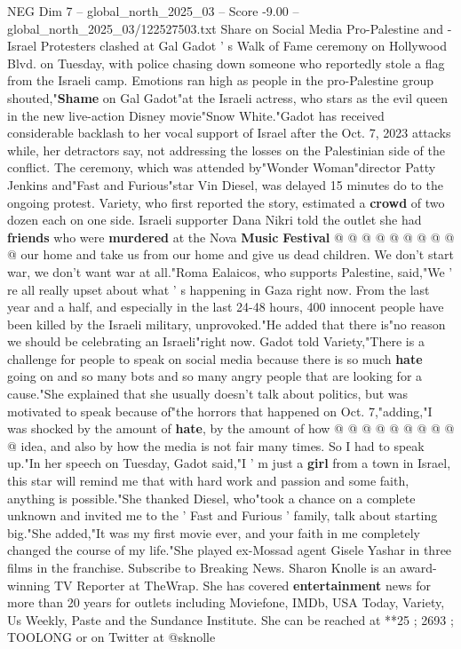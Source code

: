 \begin{textsample}{NEG Dim 7 – global\_north\_2025\_03 – Score -9.00 – global\_north\_2025\_03/122527503.txt}  \label{ex:f7_neg_124}
Share on Social Media Pro-Palestine and -Israel Protesters clashed at Gal Gadot ' s Walk of Fame ceremony on Hollywood Blvd. on Tuesday, with police chasing down someone who reportedly stole a flag from the Israeli camp.
Emotions ran high as people in the pro-Palestine group shouted,"\textbf{Shame} on Gal Gadot"at the Israeli actress, who stars as the evil queen in the new live-action Disney movie"Snow White."Gadot has received considerable backlash to her vocal support of Israel after the Oct. 7, 2023 attacks while, her detractors say, not addressing the losses on the Palestinian side of the conflict.
The ceremony, which was attended by"Wonder Woman"director Patty Jenkins and"Fast and Furious"star Vin Diesel, was delayed 15 minutes do to the ongoing protest.
Variety, who first reported the story, estimated a \textbf{crowd} of two dozen each on one side.
Israeli supporter Dana Nikri told the outlet she had \textbf{friends} who were \textbf{murdered} at the Nova \textbf{Music} \textbf{Festival} @ @ @ @ @ @ @ @ @ @ our home and take us from our home and give us dead children.
We don't start war, we don't want war at all."Roma Ealaicos, who supports Palestine, said,"We ' re all really upset about what ' s happening in Gaza right now.
From the last year and a half, and especially in the last 24-48 hours, 400 innocent people have been killed by the Israeli military, unprovoked."He added that there is"no reason we should be celebrating an Israeli"right now.
Gadot told Variety,"There is a challenge for people to speak on social media because there is so much \textbf{hate} going on and so many bots and so many angry people that are looking for a cause."She explained that she usually doesn't talk about politics, but was motivated to speak because of"the horrors that happened on Oct. 7,"adding,"I was shocked by the amount of \textbf{hate}, by the amount of how @ @ @ @ @ @ @ @ @ @ idea, and also by how the media is not fair many times.
So I had to speak up."In her speech on Tuesday, Gadot said,"I ' m just a \textbf{girl} from a town in Israel, this star will remind me that with hard work and passion and some faith, anything is possible."She thanked Diesel, who"took a chance on a complete unknown and invited me to the ' Fast and Furious ' family, talk about starting big."She added,"It was my first movie ever, and your faith in me completely changed the course of my life."She played ex-Mossad agent Gisele Yashar in three films in the franchise.
Subscribe to Breaking News.
Sharon Knolle is an award-winning TV Reporter at TheWrap.
She has covered \textbf{entertainment} news for more than 20 years for outlets including Moviefone, IMDb, USA Today, Variety, Us Weekly, Paste and the Sundance Institute.
She can be reached at **25 ; 2693 ; TOOLONG or on Twitter at @sknolle

\end{textsample}
